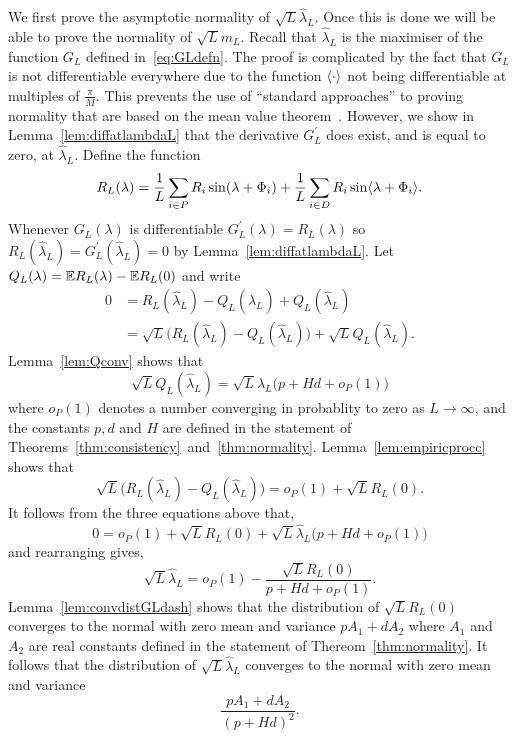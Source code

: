 \documentclass[journal]{IEEEtran}
\begin{document}
We first prove the asymptotic normality of $\sqrt{L} \hat{\lambda}_L$.  Once this is done we will be able to prove the normality of $\sqrt{L} m_L$.  Recall that $\hat{\lambda}_L$ is the maximiser of the function $G_L$ defined in~\eqref{eq:GLdefn}.  The proof is complicated by the fact that $G_L$ is not differentiable everywhere due to the function $\left\langle \cdot \right\rangle$ not being differentiable at multiples of $\tfrac{\pi}{M}$.  This prevents the use of ``standard approaches'' to proving normality that are based on the mean value theorem~\cite{vonMises_diff_stats_1947,vanDerVart1971_asymptotic_stats,Pollard_new_ways_clts_1986,Pollard_conv_stat_proc_1984,Pollard_asymp_empi_proc_1989}.  However, we show in Lemma~\ref{lem:diffatlambdaL} that the derivative $G_L^\prime$ does exist, and is equal to zero, at $\hat{\lambda}_L$. Define the function
\begin{equation}\label{eq:RLdef}
R_L(\lambda) = \frac{1}{L} \sum_{i \in P} R_i \sin(\lambda + \Phi_i) + \frac{1}{L} \sum_{i \in D} R_i \sin\langle \lambda + \Phi_i \rangle.
\end{equation}
Whenever $G_L(\lambda)$ is differentiable $G_L^\prime(\lambda) = R_L(\lambda)$ so $R_L(\hat{\lambda}_L) = G_L^\prime(\hat{\lambda}_L) = 0$ by Lemma~\ref{lem:diffatlambdaL}.  Let $Q_L(\lambda) = {\mathbb E} R_L(\lambda) - {\mathbb E} R_L(0)$ and write
\begin{align*}
0 &= R_L(\hat{\lambda}_L) - Q_L(\hat{\lambda}_L) + Q_L(\hat{\lambda}_L) \\
&= \sqrt{L}\big( R_L(\hat{\lambda}_L) - Q_L(\hat{\lambda}_L) \big) + \sqrt{L}Q_L(\hat{\lambda}_L).
\end{align*}
Lemma~\ref{lem:Qconv} shows that
\[
\sqrt{L} Q_L(\hat{\lambda}_L) = \sqrt{L} \hat{\lambda}_L\big( p + Hd  + o_P(1) \big)
\]
where $o_P(1)$ denotes a number converging in probablity to zero as $L \rightarrow \infty$, and the constants $p,d$ and $H$ are defined in the statement of Theorems~\ref{thm:consistency}~and~\ref{thm:normality}.  Lemma~\ref{lem:empiricprocc} shows that
\[
\sqrt{L}\big( R_L(\hat{\lambda}_L) - Q_L(\hat{\lambda}_L) \big) = o_P(1) + \sqrt{L} R_L(0).
\]
It follows from the three equations above that,
\[
0 = o_P(1) + \sqrt{L}R_L(0) + \sqrt{L} \hat{\lambda}_L \big( p + Hd  + o_P(1) \big)
\]
and rearranging gives,
\[
\sqrt{L} \hat{\lambda}_L = o_P(1) - \frac{\sqrt{L}R_L(0)}{p + Hd  + o_P(1)}.
\]
Lemma~\ref{lem:convdistGLdash} shows that the distribution of $\sqrt{L}R_L(0)$ converges to the normal with zero mean and variance $pA_1 + dA_2$ where $A_1$ and $A_2$ are real constants defined in the statement of Thereom~\ref{thm:normality}.  It follows that the distribution of $\sqrt{L}\hat{\lambda}_L$ converges to the normal with zero mean and variance
\[
\frac{pA_1 + dA_2}{(p + Hd)^2}.
\]
 
\end{document}
